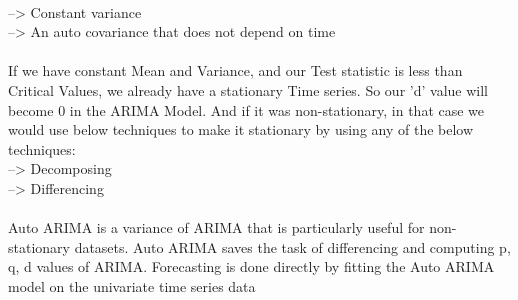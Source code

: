  \\
 -->  Constant variance 
 \\
 -->  An auto covariance that does not depend on time
\\
\\
If we have constant Mean and Variance, and our Test statistic is less than Critical Values, we already have a stationary Time series. So our 'd' value will become 0 in the ARIMA Model. And if it was non-stationary, in that case we would use below techniques to make it stationary by using any of the below techniques:
\\
 -->  Decomposing
 \\
 -->  Differencing
\\
\\
Auto ARIMA is a variance of ARIMA that is particularly useful for non-stationary datasets. Auto ARIMA saves the task of differencing and computing p, q, d values of ARIMA. Forecasting is done directly by fitting the Auto ARIMA model on the univariate time series data
\\
\\
\\
\\
\\
\\
\\

